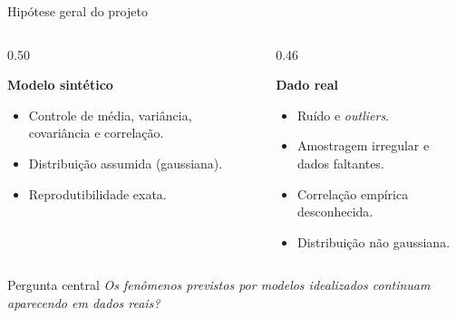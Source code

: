 \documentclass[aspectratio=169, 11pt]{beamer}
\begin{document}
\begin{frame}{Hipótese geral do projeto}

\begin{columns}[T]
\begin{column}{0.50\textwidth}

\textbf{Modelo sintético}
\begin{itemize}
  \item Controle de média, variância, covariância e correlação.
  \item Distribuição assumida (gaussiana).
  \item Reprodutibilidade exata.
\end{itemize}

\end{column}
\begin{column}{0.46\textwidth}

\textbf{Dado real}
\begin{itemize}
  \item Ruído e \textit{outliers}.
  \item Amostragem irregular e dados faltantes.
  \item Correlação empírica desconhecida.
  \item Distribuição não gaussiana.
\end{itemize}

\end{column}
\end{columns}

\vspace{0.8em}
\begin{block}{Pergunta central}
\centering
\itshape
Os fenômenos previstos por modelos idealizados continuam aparecendo em dados reais?
\end{block}

\end{frame}
\end{document}

